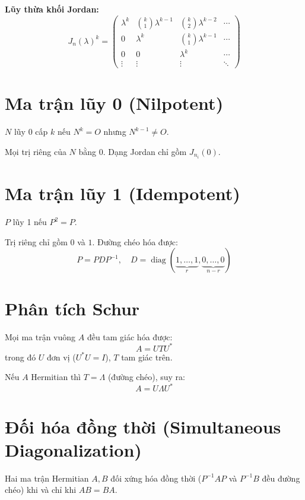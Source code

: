 \textbf{Lũy thừa khối Jordan:}
\[
J_n(\lambda)^k = \begin{pmatrix}
\lambda^k & \binom{k}{1}\lambda^{k-1} & \binom{k}{2}\lambda^{k-2} & \cdots \\
0 & \lambda^k & \binom{k}{1}\lambda^{k-1} & \cdots \\
0 & 0 & \lambda^k & \cdots \\
\vdots & \vdots & \vdots & \ddots
\end{pmatrix}
\]

\section{Ma trận lũy 0 (Nilpotent)}

$N$ lũy 0 cấp $k$ nếu $N^k = O$ nhưng $N^{k-1} \neq O$.

Mọi trị riêng của $N$ bằng $0$. Dạng Jordan chỉ gồm $J_{n_i}(0)$.

\section{Ma trận lũy 1 (Idempotent)}

$P$ lũy 1 nếu $P^2 = P$.

Trị riêng chỉ gồm $0$ và $1$. Đường chéo hóa được:
\[
P = PDP^{-1}, \quad D = \operatorname{diag}(\underbrace{1,\dots,1}_{r},\underbrace{0,\dots,0}_{n-r})
\]

\section{Phân tích Schur}

Mọi ma trận vuông $A$ đều tam giác hóa được:
\[
A = UTU^*
\]
trong đó $U$ đơn vị ($U^*U = I$), $T$ tam giác trên.

Nếu $A$ Hermitian thì $T = \Lambda$ (đường chéo), suy ra:
\[
A = U\Lambda U^*
\]

\section{Đối hóa đồng thời (Simultaneous Diagonalization)}

Hai ma trận Hermitian $A, B$ đối xứng hóa đồng thời ($P^{-1}AP$ và $P^{-1}B$ đều đường chéo) khi và chỉ khi $AB = BA$.

